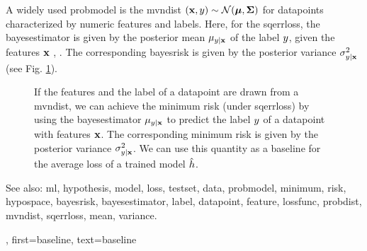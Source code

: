 {{	A widely used \gls{probmodel} is the \gls{mvndist} $\left( {\bf x},y \right) \sim \mathcal{N}({\bm \mu},{\bm \Sigma})$ 
	for \glspl{datapoint} characterized by numeric \glspl{feature} and \glspl{label}.
	Here, for the \gls{sqerrloss}, the \gls{bayesestimator} is given by the posterior 
	\gls{mean} $\mu_{y|{\bf x}}$ of the \gls{label} $y$, given the 
	\glspl{feature} ${\bf x}$ \cite{LC}, \cite{GrayProbBook}. The corresponding \gls{bayesrisk} 
	is given by the posterior \gls{variance} 
	$\sigma^{2}_{y|{\bf x}}$ (see Fig. \ref{fig_post_baseline_dict}).
	\begin{figure}[H]
		\begin{center}
		\end{center}
		\caption{If the \glspl{feature} and the \gls{label} of a \gls{datapoint} are drawn from a \gls{mvndist}, we 
		can achieve the \gls{minimum} \gls{risk} (under \gls{sqerrloss}) by using the \gls{bayesestimator} $\mu_{y|{\bf x}}$ 
		to predict the \gls{label} $y$ of a \gls{datapoint} with \glspl{feature} ${\bf x}$. The corresponding 
		\gls{minimum} \gls{risk} is given by the posterior \gls{variance} $\sigma^{2}_{y|{\bf x}}$. We can use 
		this quantity as a baseline for the average \gls{loss} of a trained \gls{model} $\hat{h}$. \label{fig_post_baseline_dict}}
		\end{figure}
		See also: \gls{ml}, \gls{hypothesis}, \gls{model}, \gls{loss}, \gls{testset}, \gls{data}, \gls{probmodel}, \gls{minimum}, \gls{risk}, \gls{hypospace}, \gls{bayesrisk}, \gls{bayesestimator}, \gls{label}, \gls{datapoint}, \gls{feature}, \gls{lossfunc}, \gls{probdist}, \gls{mvndist}, \gls{sqerrloss}, \gls{mean}, \gls{variance}.},
    first={baseline},
    text={baseline}
}


